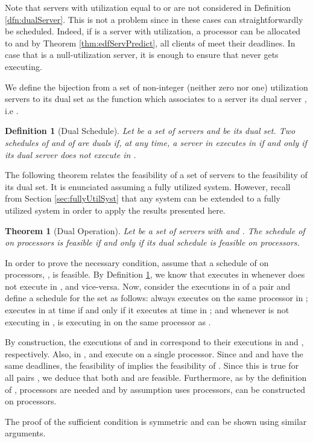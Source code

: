 \documentclass[twocolumn, compsocconf]{IEEEtran}
\newtheorem{theorem}{Theorem}[section]
\newtheorem{definition}{Definition}[section]
\newcounter{proc}
\begin{document}
Note that servers with utilization equal to  or  are not considered in
Definition \ref{dfn:dualServer}. This is not a problem since in these cases 
can straightforwardly be scheduled. Indeed, if  is a server with 
utilization, a processor can be allocated to  and by Theorem
\ref{thm:edfServPredict}, all clients of  meet their deadlines. In case that
 is a null-utilization server, it is enough to ensure that  never gets
executing.

We define the bijection  from a set of non-integer (neither zero nor one)
utilization servers  to its dual set  as the function
which associates to a server  its dual server , i.e .


\begin{definition}[Dual Schedule]\label{dfn:dualSchedule}
  Let  be a set of servers and  be its dual set.  Two
  schedules  of  and  of  are duals if,
  at any time, a server  in  executes in  if and only if
  its dual server  does not execute in .
\end{definition}

The following theorem relates the feasibility of a set of servers to the
feasibility of its dual set. It is enunciated assuming a fully utilized
system. However, recall from Section \ref{sec:fullyUtilSyst} that any system can
be extended to a fully utilized system in order to apply the results presented
here.

\begin{theorem}[Dual Operation]\label{thm:dualSched}
  Let  be a set of  servers
  with  and . The schedule  of
   on  processors is feasible if and only if its dual schedule
   is feasible on  processors.
\end{theorem}

\begin{IEEEproof}
  In order to prove the necessary condition, assume that a schedule of
   on  processors, , is feasible.  By Definition
  \ref{dfn:dualSchedule}, we know that  executes in  whenever
   does not execute in , and vice-versa. Now, consider the
  executions in  of a pair  and define a
  schedule  for the set  as follows:  always executes on the same processor in
  ;  executes in  at time  if and only if it
  executes at time  in ; and whenever  is not executing in
  ,  is executing in  on the same processor as
  .
  
  By construction, the executions of  and  in
   correspond to their executions in  and ,
  respectively. Also, in ,  and  execute on a single
  processor. Since  and  and  have
  the same deadlines, the feasibility of  implies the feasibility of
  . Since this is true for all pairs , we deduce that both
   and  are feasible. Furthermore, as by the definition
  of ,  processors are needed and by assumption 
  uses  processors,  can be constructed on  processors.

  The proof of the sufficient condition is symmetric and can be shown using
  similar arguments.
\end{IEEEproof}
\end{document}
